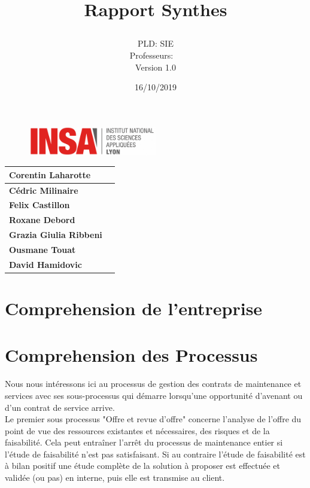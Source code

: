 \documentclass[]{scrartcl}
\title{Rapport Synthes\\
\subtitle{}
\author{PLD: SIE\\
Professeurs:\
\ \\
Version 1.0}
\date{16/10/2019}}
\begin{document}
\maketitle

\begin{figure}[h]
	\centering
  \includegraphics[width=0.5\textwidth]{img/insa-logo}
	\label{fig:logo}
\end{figure}


\begin{center}
  \begin{tabular}{ | l | r | }
    \hline
    \textbf{Corentin Laharotte}\\ \hline
    \textbf{Cédric Milinaire }\\ \hline
    \textbf{Felix Castillon}\\ \hline
    \textbf{Roxane Debord}\\ \hline
     \textbf{Grazia Giulia Ribbeni}\\ \hline
     \textbf{Ousmane Touat} \\ \hline
     \textbf{David Hamidovic} \\ \hline


  \end{tabular}
\end{center}

\thispagestyle{empty}
\pagebreak
\vspace*{10pt}
\tableofcontents
\listoffigures
\newpage

\section{Comprehension de l'entreprise}
\section{Comprehension des Processus}
Nous nous intéressons ici au processus de gestion des contrats de maintenance et services avec ses sous-processus qui démarre lorsqu'une opportunité d'avenant ou d'un contrat de service arrive.\\

Le premier sous processus "Offre et revue d'offre" concerne l'analyse de l'offre du point de vue des ressources existantes et nécessaires, des risques et de la faisabilité. Cela peut entraîner l'arrêt du processus de maintenance entier si l'étude de faisabilité n'est pas satisfaisant. Si au contraire l'étude de faisabilité est à bilan positif une étude complète de la solution à proposer est effectuée et validée (ou pas) en interne, puis elle est transmise au client.\\
\end{document}
